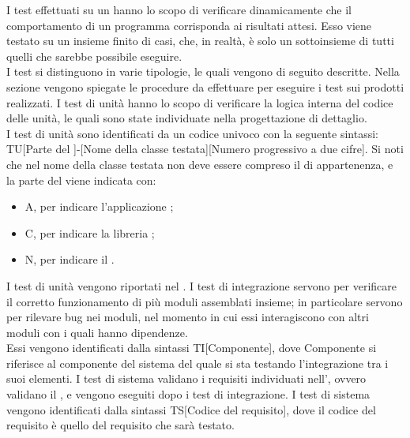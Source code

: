 		 \label{sec:test1}
		I test effettuati su un   hanno lo scopo di verificare dinamicamente che il comportamento di un programma corrisponda ai risultati attesi. Esso viene testato su un insieme finito di casi, che, in realtà, è solo un sottoinsieme di tutti quelli che sarebbe possibile eseguire.\\
		I test si distinguono in varie tipologie, le quali vengono di seguito descritte. Nella sezione  vengono spiegate le procedure da effettuare per eseguire i test sui prodotti realizzati.
				I test di unità hanno lo scopo di verificare la logica interna del codice delle unità, le quali sono state individuate nella progettazione di dettaglio. \\
				I test di unità sono identificati da un codice univoco con la seguente sintassi: TU[Parte del ]-[Nome della classe testata][Numero progressivo a due cifre]. Si noti che nel nome della classe testata non deve essere compreso il  di appartenenza, e la parte del  viene indicata con:
				\begin{itemize}
					\item A, per indicare l'applicazione ;
					\item C, per indicare la libreria ;
					\item N, per indicare il  .
				\end{itemize}
				I test di unità vengono riportati nel .
				I test di integrazione servono per verificare il corretto funzionamento di più moduli assemblati insieme; in particolare servono per rilevare bug nei moduli, nel momento in cui essi interagiscono con altri moduli con i quali hanno dipendenze.\\
				Essi vengono identificati dalla sintassi TI[Componente], dove Componente si riferisce al componente del sistema del quale si sta testando l'integrazione tra i suoi elementi.
				I test di sistema validano i requisiti individuati nell', ovvero validano il  , e vengono eseguiti dopo i test di integrazione.
				I test di sistema vengono identificati dalla sintassi TS[Codice del requisito], dove il codice del requisito è quello del requisito che sarà testato.\\
